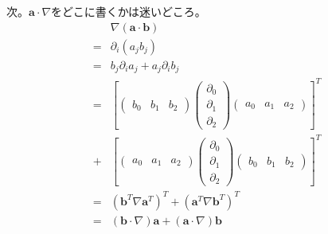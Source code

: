次。$\bm{a}\cdot\nabla$をどこに書くかは迷いどころ。
\begin{align}
&\nabla\left(\bm{a}\cdot\bm{b}\right)\\
=&\partial_i\left(a_jb_j\right)\\
=&b_j\partial_ia_j+a_j\partial_ib_j\\
=&
\left[
\left(
\begin{array}{ccc}b_0 & b_1 & b_2\end{array}
\right)
\left(
\begin{array}{c}
\partial_0\\\partial_1\\\partial_2
\end{array}
\right)
\left(
\begin{array}{ccc}a_0 & a_1 & a_2\end{array}
\right)
\right]^T\\
+&\left[
\left(
\begin{array}{ccc}a_0 & a_1 & a_2\end{array}
\right)
\left(
\begin{array}{c}
\partial_0\\\partial_1\\\partial_2
\end{array}
\right)
\left(
\begin{array}{ccc}b_0 & b_1 & b_2\end{array}
\right)
\right]^T\\
=&\left(\bm{b}^T\nabla\bm{a}^T\right)^T
 +\left(\bm{a}^T\nabla\bm{b}^T\right)^T\\
=&\left(\bm{b}\cdot\nabla\right)\bm{a}
 +\left(\bm{a}\cdot\nabla\right)\bm{b}
\end{align}

